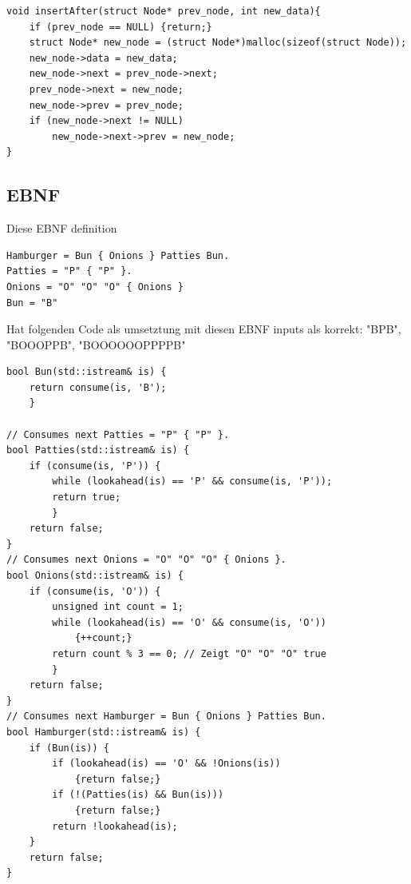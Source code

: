 \begin{lstlisting}
void insertAfter(struct Node* prev_node, int new_data){
	if (prev_node == NULL) {return;}
	struct Node* new_node = (struct Node*)malloc(sizeof(struct Node));
	new_node->data = new_data;
	new_node->next = prev_node->next;
	prev_node->next = new_node;
	new_node->prev = prev_node;
	if (new_node->next != NULL)
		new_node->next->prev = new_node;
}
\end{lstlisting}
\subsection{EBNF}
Diese EBNF definition
\begin{lstlisting}
Hamburger = Bun { Onions } Patties Bun.
Patties = "P" { "P" }.
Onions = "O" "O" "O" { Onions }
Bun = "B"
\end{lstlisting}
Hat folgenden Code als umsetztung mit diesen EBNF inputs als korrekt: "BPB", "BOOOPPB", "BOOOOOOPPPPB"
\begin{lstlisting}
bool Bun(std::istream& is) {
	return consume(is, 'B'); 
	}

// Consumes next Patties = "P" { "P" }.
bool Patties(std::istream& is) {
	if (consume(is, 'P')) {
		while (lookahead(is) == 'P' && consume(is, 'P'));
		return true;
		}
	return false;
}
// Consumes next Onions = "O" "O" "O" { Onions }.
bool Onions(std::istream& is) {
	if (consume(is, 'O')) {
		unsigned int count = 1;
		while (lookahead(is) == 'O' && consume(is, 'O'))
			{++count;}
		return count % 3 == 0; // Zeigt "O" "O" "O" true
		}
	return false;
}
// Consumes next Hamburger = Bun { Onions } Patties Bun.
bool Hamburger(std::istream& is) {
	if (Bun(is)) {
		if (lookahead(is) == 'O' && !Onions(is))
			{return false;}
		if (!(Patties(is) && Bun(is)))
			{return false;}
		return !lookahead(is);
	}
	return false;
}
\end{lstlisting}


